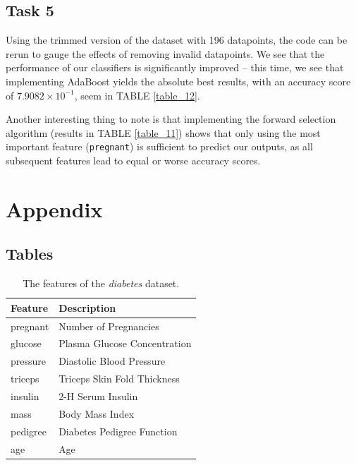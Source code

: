\documentclass[twoside,twocolumn,10pt]{revtex4-1}
\begin{document}
	\subsection*{Task 5}
	
	Using the trimmed version of the dataset with 196 datapoints, the code can be rerun to gauge the effects of removing invalid datapoints.  We see that the performance of our classifiers is significantly improved – this time, we see that implementing AdaBoost yields the absolute best results, with an accuracy score of $7.9082 \times 10^{-1}$, seem in TABLE \ref{table_12}.  
	
	Another interesting thing to note is that implementing the forward selection algorithm (results in TABLE \ref{table_11}) shows that only using the most important feature (\texttt{pregnant}) is sufficient to predict our outputs, as all subsequent features lead to equal or worse accuracy scores.
	
	\section{Appendix}
	
	
	\subsection{Tables}
	
	\begin{table}[H]
	\center
		\begin{tabular}{l l}
		\textbf{Feature} & \textbf{Description} \\ 
		\hline
		pregnant & Number of Pregnancies\\
		glucose & Plasma Glucose Concentration\\
		pressure & Diastolic Blood Pressure\\
		triceps & Triceps Skin Fold Thickness\\
		insulin & 2-H Serum Insulin\\
		mass & Body Mass Index\\
		pedigree & Diabetes Pedigree Function\\
		age & Age
		\end{tabular}
		\caption{The features of the \textit{diabetes} dataset.\label{table_1}}
	\end{table}
	
\end{document}
